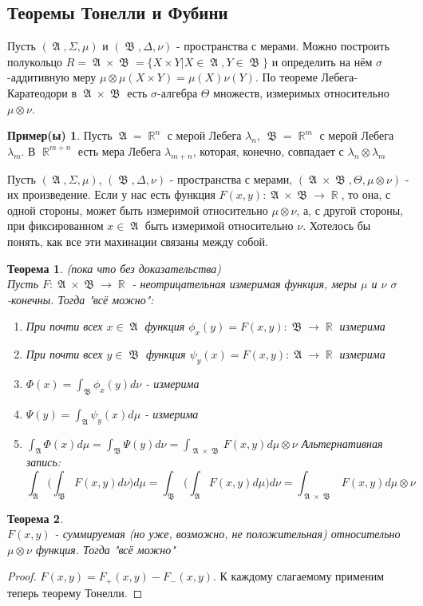 \documentclass[a4paper]{article}
\theoremstyle{indented}
\newtheorem{theorem}{Теорема}
\theoremstyle{definition}
\newtheorem{exl}{Пример(ы)}
\theoremstyle{remark}
\DeclareMathOperator{\ra}{\rightarrow}
\DeclareMathOperator{\RR}{\mathbb{R}}
\DeclareMathOperator{\GA}{\mathfrak{A}}
\DeclareMathOperator{\GB}{\mathfrak{B}}
\begin{document}
\subsection{Теоремы Тонелли и Фубини}
Пусть $(\GA, \Sigma, \mu)$ и $(\GB, \Delta, \nu)$ - пространства с мерами. Можно построить полукольцо $R = \GA \times \GB = \{X \times Y | X \in \GA, Y \in \GB\}$ и определить на нём $\sigma$-аддитивную меру $\mu \otimes \mu(X \times Y) = \mu(X)\nu(Y)$. По теореме Лебега-Каратеодори в $\GA \times \GB$ есть $\sigma$-алгебра $\Theta$ множеств, измеримых относительно $\mu \otimes \nu$.
\begin{exl}
Пусть $\GA=\RR^n$ с мерой Лебега $\lambda_n$, $\GB=\RR^m$ с мерой Лебега $\lambda_m$. В $\RR^{m+n}$ есть мера Лебега $\lambda_{m+n}$, которая, конечно, совпадает с $\lambda_n \otimes \lambda_m$
\end{exl}
Пусть $(\GA, \Sigma, \mu)$, $(\GB, \Delta, \nu)$ - пространства с мерами, $(\GA \times \GB, \Theta, \mu \otimes \nu)$ - их произведение. Если у нас есть функция $F(x, y): \GA \times \GB \ra \RR$, то она, с одной стороны, может быть измеримой относительно $\mu \otimes \nu$, а, с другой стороны, при фиксированном $x \in \GA$ быть измеримой относительно $\nu$. Хотелось бы понять, как все эти махинации связаны между собой.
\begin{theorem}
 (пока что без доказательства)
\\Пусть $F: \GA \times \GB \ra \RR$ - неотрицательная измеримая функция, меры $\mu$ и $\nu$ $\sigma$-конечны.
Тогда "всё можно": 
\begin{enumerate}
\item При почти всех $x \in \GA$ функция $\phi_x(y)=F(x, y ): \GB \ra \RR$ измерима
\item При почти всех $y \in \GB$ функция $\psi_y(x)=F(x, y ): \GA \ra \RR$ измерима
\item $\Phi(x) = \int_{\GB} \phi_x(y) d \nu$ - измерима
\item $\Psi(y) = \int_{\GA} \psi_y(x) d \mu$ - измерима
\item $\int_{\GA} \Phi(x) d \mu = \int_{\GB} \Psi(y) d \nu = \int_{\GA \times \GB} F(x, y) d \mu \otimes \nu$
Альтернативная запись: $$\int_{\GA} \Big ( \int_{\GB} F(x, y) d \nu \Big ) d \mu = \int_{\GB} \Big ( \int_{\GA} F(x, y) d \mu \Big ) d \nu = \int_{\GA \times \GB} F(x, y) d \mu \otimes \nu$$
\end{enumerate}
\end{theorem}
\begin{theorem}
\\
$F(x, y)$ - суммируемая (но уже, возможно, не положительная) относительно $\mu \otimes \nu$ функция. Тогда "всё можно"
\end{theorem}
\begin{proof}
$F(x, y) = F_+(x, y)-F_-(x, y)$. К каждому слагаемому применим теперь теорему Тонелли.
\end{proof}
\end{document}
